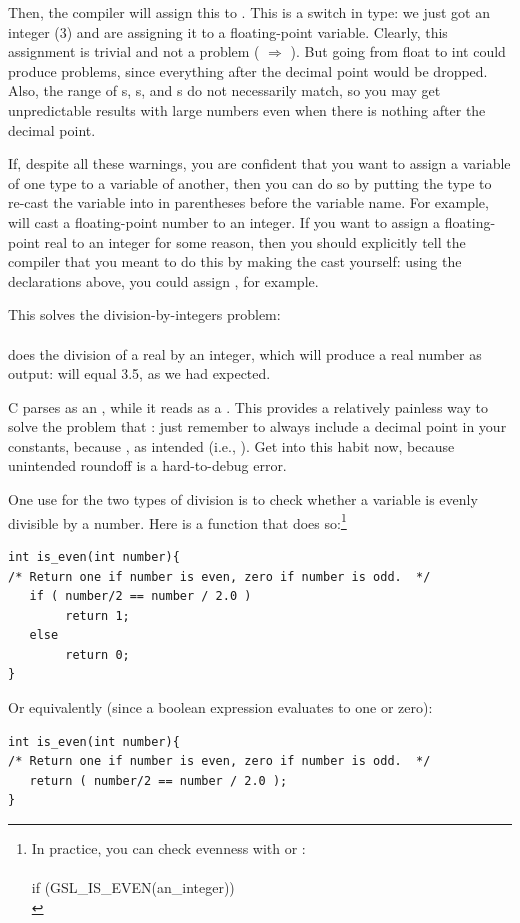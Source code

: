 \documentclass[12pt]{article}
\begin{document}
Then, the compiler will assign this to . This is a
switch in type: we just got an integer (3) and are assigning it to
a floating-point variable. Clearly, this assignment is trivial and
not a problem ( $\Rightarrow$ ).  But going from
float to int could produce problems, since everything after the decimal point
would be dropped.  Also, the range of s, s,
and s do not necessarily match, so you may get unpredictable
results with large numbers even when there is nothing after the decimal
point.

If, despite all these warnings, you are confident that you want to
assign a variable of one type to a variable of another, then you can
do so by putting the type to re-cast the variable into in parentheses
before the variable name. For example,  will
cast a floating-point number to an integer.  If you want to assign
a floating-point real to an integer for some reason, then you should
explicitly tell the compiler that you meant to do this by making the cast
yourself: using the declarations above, you could assign , for example.

This solves the division-by-integers problem: \\
\\
does the division of a real by an integer, which will produce a real
number as output:  will equal 3.5, as we had expected.

C parses  as an , while it reads 
as a . This provides a relatively painless way to solve
the problem that : just remember to always include
a decimal point in your constants, because ,
as intended (i.e., ). Get into this
habit now, because unintended roundoff is a hard-to-debug error.

One use for the two types of division is to check whether a variable is evenly divisible by a number. Here
is a function that does so:\footnote{In practice, you can check evenness
with  or :\\ 
\\
if (GSL\_IS\_EVEN(an\_integer))\\
\phantom{hello.}
}

\begin{lstlisting}
int is_even(int number){
/* Return one if number is even, zero if number is odd.  */
   if ( number/2 == number / 2.0 )
        return 1;
   else 
        return 0;
}
\end{lstlisting}
Or equivalently (since a boolean expression evaluates to one or zero):
\begin{lstlisting}
int is_even(int number){
/* Return one if number is even, zero if number is odd.  */
   return ( number/2 == number / 2.0 );
}
\end{lstlisting}
\end{document}
